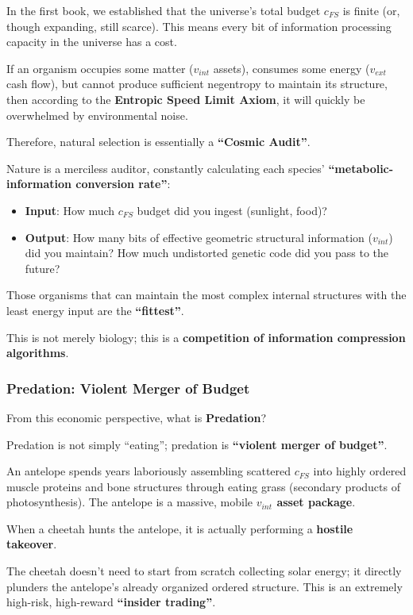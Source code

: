 In the first book, we established that the universe's total budget $c_{FS}$ is finite (or, though expanding, still scarce). This means every bit of information processing capacity in the universe has a cost.

If an organism occupies some matter ($v_{int}$ assets), consumes some energy ($v_{ext}$ cash flow), but cannot produce sufficient negentropy to maintain its structure, then according to the \textbf{Entropic Speed Limit Axiom}, it will quickly be overwhelmed by environmental noise.

Therefore, natural selection is essentially a \textbf{``Cosmic Audit''}.

Nature is a merciless auditor, constantly calculating each species' \textbf{``metabolic-information conversion rate''}:

\begin{itemize}
\item \textbf{Input}: How much $c_{FS}$ budget did you ingest (sunlight, food)?

\item \textbf{Output}: How many bits of effective geometric structural information ($v_{int}$) did you maintain? How much undistorted genetic code did you pass to the future?
\end{itemize}

Those organisms that can maintain the most complex internal structures with the least energy input are the \textbf{``fittest''}.

This is not merely biology; this is a \textbf{competition of information compression algorithms}.

\subsubsection{Predation: Violent Merger of Budget}

From this economic perspective, what is \textbf{Predation}?

Predation is not simply ``eating''; predation is \textbf{``violent merger of budget''}.

An antelope spends years laboriously assembling scattered $c_{FS}$ into highly ordered muscle proteins and bone structures through eating grass (secondary products of photosynthesis). The antelope is a massive, mobile \textbf{$v_{int}$ asset package}.

When a cheetah hunts the antelope, it is actually performing a \textbf{hostile takeover}.

The cheetah doesn't need to start from scratch collecting solar energy; it directly plunders the antelope's already organized ordered structure. This is an extremely high-risk, high-reward \textbf{``insider trading''}.

